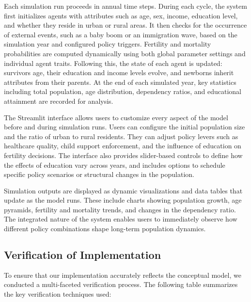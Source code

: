 \documentclass[12pt]{article}
\begin{document}
Each simulation run proceeds in annual time steps. During each cycle, the system first initializes agents with attributes such as age, sex, income, education level, and whether they reside in urban or rural areas. It then checks for the occurrence of external events, such as a baby boom or an immigration wave, based on the simulation year and configured policy triggers. Fertility and mortality probabilities are computed dynamically using both global parameter settings and individual agent traits. Following this, the state of each agent is updated: survivors age, their education and income levels evolve, and newborns inherit attributes from their parents. At the end of each simulated year, key statistics including total population, age distribution, dependency ratios, and educational attainment are recorded for analysis.

The Streamlit interface allows users to customize every aspect of the model before and during simulation runs. Users can configure the initial population size and the ratio of urban to rural residents. They can adjust policy levers such as healthcare quality, child support enforcement, and the influence of education on fertility decisions. The interface also provides slider-based controls to define how the effects of education vary across years, and includes options to schedule specific policy scenarios or structural changes in the population.

Simulation outputs are displayed as dynamic visualizations and data tables that update as the model runs. These include charts showing population growth, age pyramids, fertility and mortality trends, and changes in the dependency ratio. The integrated nature of the system enables users to immediately observe how different policy combinations shape long-term population dynamics.


\subsection{Verification of Implementation}

To ensure that our implementation accurately reflects the conceptual model, we conducted a multi-faceted verification process. The following table summarizes the key verification techniques used:
\end{document}

